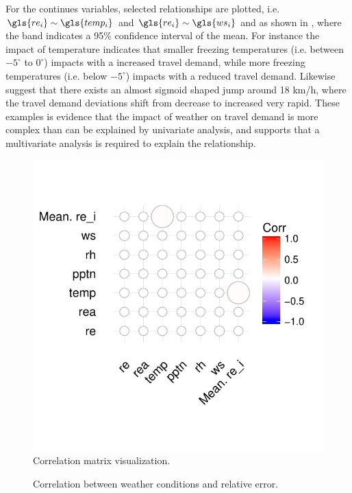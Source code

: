 For the continues variables, selected relationships are plotted, i.e.\ $\gls{re_i} \sim \gls{temp_i}$ and $\gls{re_i} \sim \gls{ws_i}$ and as shown in , where the band indicates a 95\% confidence interval of the mean. For instance the impact of temperature indicates that smaller freezing temperatures (i.e. between $-5^{\circ}$ to $0^{\circ}$) impacts with a increased travel demand, while more freezing temperatures (i.e. below $-5^{\circ}$) impacts with a reduced travel demand. Likewise  suggest that there exists an almost sigmoid shaped jump around 18 km/h, where the travel demand deviations shift from decrease to increased very rapid. These examples is evidence that the impact of weather on travel demand is more complex than can be explained by univariate analysis, and supports that a multivariate analysis is required to explain the relationship.
\vspace{-3em}
\begin{figure}[!ht]
    \center
    \includegraphics{../plots/cor_matrix}
    \vspace{-2em}
    \caption{Correlation matrix visualization.}
    \label{fig:cor_matrix}
\end{figure}
\vspace{-1em}
\begin{figure}[!ht]
    \center
    
    \vspace{-1em}
    \caption{Correlation between weather conditions and relative error.}
    \label{fig:cor_cond}
\end{figure}
\vspace{-1em}

